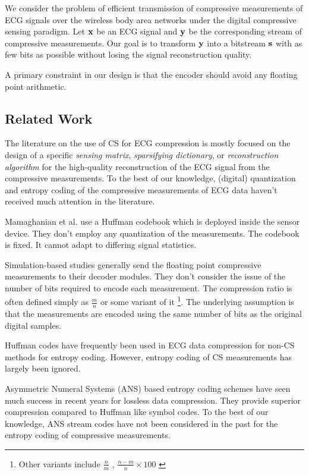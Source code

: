 We consider the problem of efficient transmission of
compressive measurements of ECG signals over the wireless body
area networks under the digital compressive sensing paradigm.
Let $\mathbf{x}$ be an ECG signal and $\mathbf{y}$ be the corresponding
stream of compressive measurements. Our goal is to
transform $\mathbf{y}$ into a bitstream $\mathbf{s}$ with as few bits
as possible without losing the signal reconstruction quality.

A primary constraint in our design is that the encoder
should avoid any floating point arithmetic.


\subsection{Related Work}

The literature on the use of CS for ECG compression is mostly
focused on the design of a specific \emph{sensing matrix},
\emph{sparsifying dictionary}, or \emph{reconstruction algorithm}
for the high-quality reconstruction of the ECG signal from the
compressive measurements.
To the best of our knowledge, (digital) quantization and entropy coding of
the compressive measurements of ECG data haven't received much attention
in the literature.

Mamaghanian et al.\cite{mamaghanian2011compressed} use a Huffman codebook
which is deployed inside the sensor device. They don't
employ any quantization of the measurements.
The codebook is fixed. It cannot adapt to differing signal
statistics.

Simulation-based studies generally send the floating point compressive
measurements to their decoder modules.
They don't consider the issue of
the number of bits required to encode each measurement.
The compression ratio is often defined simply as $\frac{m}{n}$
or some variant of it
\footnote{Other variants include
$\frac{n}{m}$ \cite{zhang2012compressed},
$\frac{n-m}{n} \times 100$ \cite{zhang2021csnet}}.
The underlying assumption is that the measurements are
encoded using the same number of bits as the original digital samples.

Huffman codes have frequently been used in ECG data
compression for non-CS methods \cite{luo2014dynamic,chouakri2013wavelet}
for entropy coding.
However, entropy coding of CS measurements has largely been ignored.

Asymmetric Numeral Systems (ANS) \cite{duda2013asymmetric}
based entropy coding schemes have seen much success
in recent years for lossless data compression.
They provide superior compression compared to Huffman
like symbol codes.
To the best of our knowledge, ANS stream codes
have not been considered in the past for the entropy
coding of compressive measurements.


